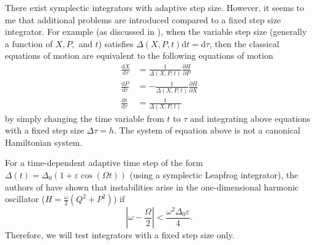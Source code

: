\documentclass{article}
\newcommand{\dif}{\mathrm{d}}
\begin{document}
There exist symplectic integrators with adaptive step size. However, it seems to me that additional problems are introduced compared to a fixed step size integrator. For example (as discussed in \cite{richardson2011symplectic}), when the variable step size (generally a function of $X,P,$ and $t$) satisfies $\Delta(X,P,t) \dif t = \dif \tau$, then the classical equations of motion are equivalent to the following equations of motion
\begin{align*}
	\frac{\dif X}{\dif \tau} &= \frac{1}{\Delta(X,P,t)}\frac{\partial H}{\partial P}\\
	\frac{\dif P}{\dif \tau} &= -\frac{1}{\Delta(X,P,t)}\frac{\partial H}{\partial X}\\
	\frac{\dif t}{\dif \tau} &= \frac{1}{\Delta(X,P,t)}
\end{align*}
by simply changing the time variable from $t$ to $\tau$ and integrating above equations with a fixed step size $\Delta \tau = h$. The system of equation above is not a canonical Hamiltonian system. 

For a time-dependent adaptive time step of the form $\Delta(t)=\Delta_0 (1+\varepsilon\cos(\Omega t))$ (using a symplectic Leapfrog integrator), the authors of \cite{richardson2011symplectic} have shown that instabilities arise in the one-dimensional harmonic oscillator ($H=\frac{\omega}{2}(Q^2+P^2)$) if 
\begin{equation*}
	\left\vert\omega-\frac{\Omega}{2}\right\vert < \frac{\omega^2 \Delta_0\varepsilon}{4}.
\end{equation*}
Therefore, we will test integrators with a fixed step size only.
\end{document}
